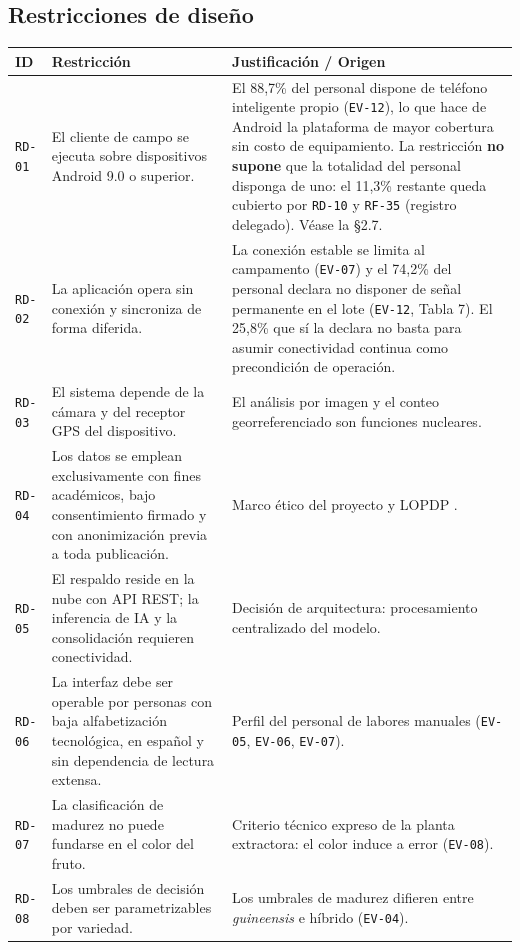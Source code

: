 \documentclass[11pt,a4paper]{article}
\newcommand{\id}[1]{\texttt{\begingroup\hyphenpenalty=10000\relax#1\endgroup}}
\renewcommand{\id}[1]{\texttt{#1}}
\begin{document}
\subsection{Restricciones de diseño}

\begin{longtable}{|C{1.5cm}|L{6.8cm}|L{6.6cm}|}
\hline
{}\textbf{ID} & \textbf{Restricción} & \textbf{Justificación / Origen} \\
\hline
\endhead
\id{RD-01} & El cliente de campo se ejecuta sobre dispositivos Android 9.0 o superior. & El 88,7\% del personal dispone de teléfono inteligente propio (\id{EV-12}), lo que hace de Android la plataforma de mayor cobertura sin costo de equipamiento. La restricción \textbf{no supone} que la totalidad del personal disponga de uno: el 11,3\% restante queda cubierto por \id{RD-10} y \id{RF-35} (registro delegado). Véase la §2.7. \\ \hline
\id{RD-02} & La aplicación opera sin conexión y sincroniza de forma diferida. & La conexión estable se limita al campamento (\id{EV-07}) y el 74,2\% del personal declara no disponer de señal permanente en el lote (\id{EV-12}, Tabla 7). El 25,8\% que sí la declara no basta para asumir conectividad continua como precondición de operación. \\ \hline
\id{RD-03} & El sistema depende de la cámara y del receptor GPS del dispositivo. & El análisis por imagen y el conteo georreferenciado son funciones nucleares. \\ \hline
\id{RD-04} & Los datos se emplean exclusivamente con fines académicos, bajo consentimiento firmado y con anonimización previa a toda publicación. & Marco ético del proyecto y LOPDP \cite{lopdp}. \\ \hline
\id{RD-05} & El respaldo reside en la nube con API REST; la inferencia de IA y la consolidación requieren conectividad. & Decisión de arquitectura: procesamiento centralizado del modelo. \\ \hline
\id{RD-06} & La interfaz debe ser operable por personas con baja alfabetización tecnológica, en español y sin dependencia de lectura extensa. & Perfil del personal de labores manuales (\id{EV-05}, \id{EV-06}, \id{EV-07}). \\ \hline
\id{RD-07} & La clasificación de madurez no puede fundarse en el color del fruto. & Criterio técnico expreso de la planta extractora: el color induce a error (\id{EV-08}). \\ \hline
\id{RD-08} & Los umbrales de decisión deben ser parametrizables por variedad. & Los umbrales de madurez difieren entre \emph{guineensis} e híbrido (\id{EV-04}). \\ \hline

\end{longtable}
\end{document}
